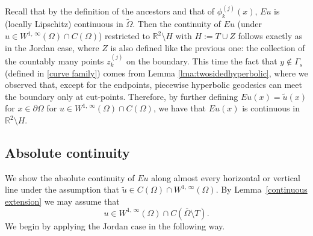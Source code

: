 \documentclass[reqno,11pt]{amsart}
\def\dist{{\mathop\mathrm{\,dist\,}}}
\def\ez{\epsilon}
\def\wz{\widetilde}
\numberwithin{equation}{section}
\theoremstyle{remark}
\begin{document}
%

Recall that by the definition of the ancestors and that of $\phi_{k}^{(j)}(x)$, $Eu$ is (locally Lipschitz) continuous in $\wz \Omega$. 
Then the continuity of $Eu$ (under $u\in W^{1,\,\infty}(\Omega)\cap C(\Omega)$) restricted to  $\mathbb R^2\setminus H$ with 
$H := T \cup Z$ follows exactly as in the Jordan case, where $Z$ is also 
defined like the previous one: the collection of the countably many 
points $z_{k}^{(j)}$ on the boundary. 
This time the fact that $y \notin \Gamma_s$ (defined in \eqref{curve family}) 
comes from Lemma \ref{lma:twosidedhyperbolic}, where 
we observed that, except for the endpoints, piecewise hyperbolic geodesics can
meet the boundary only at cut-points. 
Therefore, by further defining $Eu(x)=\wz u(x)$ for $x\in \partial \Omega$ for $u\in W^{1,\,\infty}(\Omega)\cap C(\Omega)$, 
we have that $Eu(x)$ is continuous in $\mathbb R^2\setminus H$.


\subsection{Absolute continuity}%

We show the absolute continuity of $Eu$ 
along almost every horizontal or vertical line under the assumption that $\wz u\in  C(\Omega) \cap W^{1,\,\infty}(\Omega)$. By Lemma~\ref{continuous extension} we may assume that 
$$u\in   W^{1,\,\infty}(\Omega)\cap C(\overline{\Omega}\setminus T).$$ 
We begin by applying the Jordan case in the following way.
\end{document}
